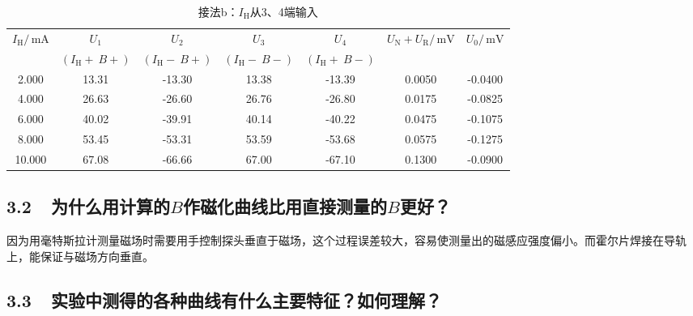 \documentclass[a4paper,fontset=windows]{ctexart}
\begin{document}
    \vspace{0.5em}
        \begin{table}[ht!]\large
            \begin{center}
                \caption*{\large 接法b：$I_\mathrm{H}$从3、4端输入}
                \begin{tabular}{ |c|c|c|c|c|c|c| }
                    \hline
                    \multirow{2}{*}{$I_\mathrm{H}/\,\mathrm{mA}$} & $U_1$ & $U_2$ & $U_3$ & $U_4$ & \multirow{2}{*}{$U_\mathrm{N} + U_\mathrm{R}/\,\mathrm{mV}$} & \multirow{2}{*}{$U_0/\,\mathrm{mV}$} \\
                    & $(I_\mathrm{H}+\ B+)$ & $(I_\mathrm{H}-\ B+)$ & $(I_\mathrm{H}-\ B-)$ & $(I_\mathrm{H}+\ B-)$ & & \\
                    \hline
                    2.000 & 13.31 & -13.30 & 13.38 & -13.39 & 0.0050 & -0.0400\\
                    \hline
                    4.000 & 26.63 & -26.60 & 26.76 & -26.80 & 0.0175 & -0.0825\\
                    \hline
                    6.000 & 40.02 & -39.91 & 40.14 & -40.22 & 0.0475 & -0.1075\\
                    \hline
                    8.000 & 53.45 & -53.31 & 53.59 & -53.68 & 0.0575 & -0.1275\\
                    \hline
                    10.000 & 67.08 & -66.66 & 67.00 & -67.10 & 0.1300 & -0.0900\\
                    \hline
                \end{tabular}
            \end{center}
        \end{table}
    \vspace{-0.5em}

    \newpage
    \subsection*{3.2\ \ 为什么用计算的$B$作磁化曲线比用直接测量的$B$更好？}

    因为用毫特斯拉计测量磁场时需要用手控制探头垂直于磁场，这个过程误差较大，容易使测量出的磁感应强度偏小。而霍尔片焊接在导轨上，能保证与磁场方向垂直。

    \subsection*{3.3\ \ 实验中测得的各种曲线有什么主要特征？如何理解？}
\end{document}
